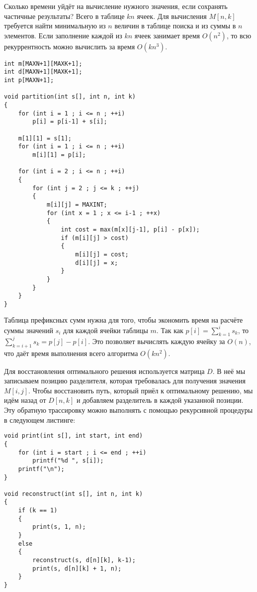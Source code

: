 \documentclass[14pt]{book}
\begin{document}
Сколько времени уйдёт на вычисление нужного значения, если сохранять частичные результаты?
Всего в таблице $kn$ ячеек. Для вычисления $M[n,k]$ требуется найти минимальную из $n$ величин
в таблице поиска и из суммы в $n$ элементов. Если заполнение каждой из $kn$ ячеек занимает время 
$O(n^2)$, то всю рекуррентность можно вычислить за время $O(kn^3)$.

\begin{lstlisting}
int m[MAXN+1][MAXK+1];
int d[MAXN+1][MAXK+1];
int p[MAXN+1];

void partition(int s[], int n, int k)
{
    for (int i = 1 ; i <= n ; ++i)
        p[i] = p[i-1] + s[i];

    m[1][1] = s[1];
    for (int i = 1 ; i <= n ; ++i)
        m[i][1] = p[i];

    for (int i = 2 ; i <= n ; ++i)
    {
        for (int j = 2 ; j <= k ; ++j)
        {
            m[i][j] = MAXINT;
            for (int x = 1 ; x <= i-1 ; ++x)
            {
                int cost = max(m[x][j-1], p[i] - p[x]);
                if (m[i][j] > cost)
                {
                    m[i][j] = cost;
                    d[i][j] = x;
                }
            }
        }
    }
}
\end{lstlisting}

Таблица префиксных сумм нужна для того, чтобы экономить время на расчёте суммы
значений $s_i$ для каждой ячейки таблицы $m$. Так как $p[i] = \sum_{k=1}^{i}s_k$,
то $\sum_{k=i+1}^{j}s_k = p[j] - p[i]$. Это позволяет вычислять каждую ячейку за
$O(n)$, что даёт время выполнения всего алгоритма $O(kn^2)$.

Для восстановления оптимального решения используется матрица $D$. В неё мы записываем
позицию разделителя, которая требовалась для получения значения $M[i,j]$. Чтобы
восстановить путь, который приёл к оптимальному решению, мы идём назад от $D[n,k]$
и добавляем разделитель в каждой указанной позиции. Эту обратную трассировку можно
выполнять с помощью рекурсивной процедуры в следующем листинге:

\begin{lstlisting}
void print(int s[], int start, int end)
{
    for (int i = start ; i <= end ; ++i)
        printf("%d ", s[i]);
    printf("\n");
}

void reconstruct(int s[], int n, int k)
{
    if (k == 1)
    {
        print(s, 1, n);
    }
    else
    {
        reconstruct(s, d[n][k], k-1);
        print(s, d[n][k] + 1, n);
    }
}
\end{lstlisting}
\end{document}
